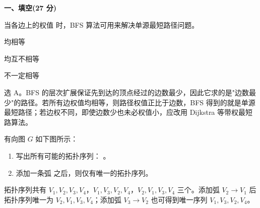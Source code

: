 

\textbf{一、填空(27 分)}
\begin{question}
当各边上的权值 \blank 时，BFS 算法可用来解决单源最短路径问题。
\begin{choiceoptions}[2]
  \item 均相等
  \item 均互不相等
  \item 不一定相等
\end{choiceoptions}
\begin{solution}
选 A。BFS 的层次扩展保证先到达的顶点经过的边数最少，因此它求的是"边数最少"的路径。若所有边权值均相等，则路径权值正比于边数，BFS 得到的就是单源最短路径；若边权不同，即使边数少也未必权值小，应改用 Dijkstra 等带权最短路算法。
\end{solution}
\end{question}

\begin{question}
有向图 $G$ 如下图所示：

\begin{center}
\end{center}

\begin{enumerate}
  \item 写出所有可能的拓扑序列： \blank。
  \item 添加一条弧 \blank 之后，则仅有唯一的拓扑序列。
\end{enumerate}
\begin{solution}
拓扑序列共有 $V_1,V_2,V_3,V_4$，$V_1,V_3,V_2,V_4$，$V_2,V_1,V_3,V_4$ 三个。添加弧 $V_2\to V_1$ 后拓扑序列唯一为 $V_2,V_1,V_3,V_4$；添加弧 $V_3\to V_2$ 也可得到唯一序列 $V_1,V_3,V_2,V_4$。
\end{solution}
\end{question}

